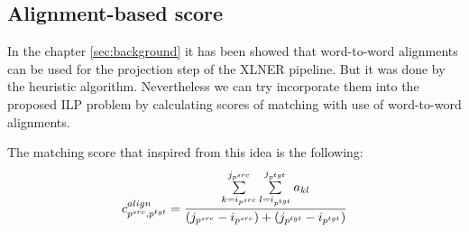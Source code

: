 \subsection{Alignment-based score}
In the chapter \ref{sec:background} it has been showed that word-to-word alignments can be used
for the projection step of the XLNER pipeline. But it was done by the heuristic algorithm.
Nevertheless we can try incorporate them into the proposed ILP problem by calculating scores of matching with use of
word-to-word alignments.

The matching score that inspired from this idea is the following:
\begin{equation} \label{eq:align_cost}
  c_{p^{src}, p^{tgt}}^{align} =
  \frac{\sum\limits_{k=i_{p^{src}}}^{j_{p^{src}}} \sum\limits_{l=i_{p^{tgt}}}^{j_{p^{tgt}}} a_{kl}}
  {(j_{p^{src}} - i_{p^{src}}) + (j_{p^{tgt}} - i_{p^{tgt}})}
\end{equation}

